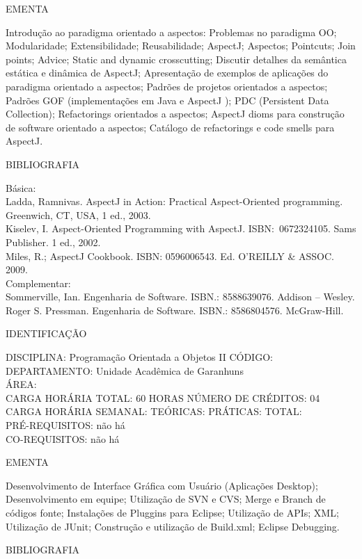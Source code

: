 \documentclass[
	12pt,				%
	openright,			%
  oneside,     %
	a4paper,			%
	english,			%
	french,				%
	spanish,			%
	brazil				%
	]{abntex2}
\begin{document}
\begin{apendicesenv}
EMENTA 

Introdução ao paradigma orientado a aspectos: Problemas no paradigma OO; Modularidade; Extensibilidade; Reusabilidade; AspectJ; Aspectos; Pointcuts; Join points; Advice; Static and dynamic crosscutting; Discutir detalhes da semântica estática e dinâmica de AspectJ; Apresentação de exemplos de aplicações do paradigma orientado a aspectos; Padrões de projetos orientados a aspectos; Padrões GOF (implementações em Java e AspectJ ); PDC (Persistent Data Collection); Refactorings orientados a aspectos; AspectJ dioms para construção de software orientado a aspectos; Catálogo de refactorings e code smells para AspectJ.

BIBLIOGRAFIA 

Básica:\\
Ladda, Ramnivas. AspectJ in Action: Practical Aspect-Oriented
programming. Greenwich, CT, USA, 1 ed., 2003.\\
Kiselev, I. Aspect-Oriented Programming with AspectJ. ISBN:~0672324105.
Sams Publisher. 1 ed., 2002.\\
Miles, R.; AspectJ Cookbook. ISBN: 0596006543. Ed. O'REILLY \& ASSOC.
2009.\\
Complementar:\\
Sommerville, Ian. Engenharia de Software. ISBN.: 8588639076. Addison --
Wesley.\\
Roger S. Pressman. Engenharia de Software. ISBN.: 8586804576.
McGraw-Hill.\

\newpage IDENTIFICAÇÃO

DISCIPLINA: Programação Orientada a Objetos II CÓDIGO:\\ 
DEPARTAMENTO: Unidade Acadêmica de Garanhuns\\ 
ÁREA: \\
CARGA HORÁRIA TOTAL: 60 HORAS NÚMERO DE CRÉDITOS: 04\\
CARGA HORÁRIA SEMANAL: TEÓRICAS: PRÁTICAS: TOTAL: \\
PRÉ-REQUISITOS: não há\\
CO-REQUISITOS: não há

EMENTA 

Desenvolvimento de Interface Gráfica com Usuário (Aplicações Desktop); Desenvolvimento em equipe; Utilização de SVN e CVS; Merge e Branch de códigos fonte; Instalações de Pluggins para Eclipse; Utilização de APIs; XML; Utilização de JUnit; Construção e utilização de Build.xml; Eclipse Debugging.

BIBLIOGRAFIA 


\end{apendicesenv}
\end{document}
